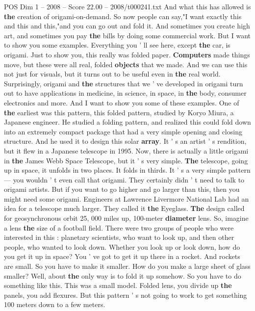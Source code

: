 \begin{textsample}{POS Dim 1 – 2008 – Score 22.00 – 2008/t000241.txt}
And what this has allowed is \textbf{the} creation of origami-on-demand.
So now people can say,"I want exactly this and this and this,"and you can go out and fold it.
And sometimes you create high art, and sometimes you pay \textbf{the} bills by doing some commercial work.
But I want to show you some examples.
Everything you ' ll see here, except \textbf{the} car, is origami.
Just to show you, this really was folded paper. \textbf{Computers} made things move, but these were all real, folded \textbf{objects} that we made.
And we can use this not just for visuals, but it turns out to be useful even in \textbf{the} real world.
Surprisingly, origami and \textbf{the} structures that we ' ve developed in origami turn out to have applications in medicine, in science, in space, in \textbf{the} body, consumer electronics and more.
And I want to show you some of these examples.
One of \textbf{the} earliest was this pattern, this folded pattern, studied by Koryo Miura, a Japanese engineer.
He studied a folding pattern, and realized this could fold down into an extremely compact package that had a very simple opening and closing structure.
And he used it to design this solar \textbf{array}.
It ' s an artist ' s rendition, but it flew in a Japanese telescope in 1995.
Now, there is actually a little origami in \textbf{the} James Webb Space Telescope, but it ' s very simple. \textbf{The} telescope, going up in space, it unfolds in two places.
It folds in thirds.
It ' s a very simple pattern — you wouldn ' t even call that origami.
They certainly didn ' t need to talk to origami artists.
But if you want to go higher and go larger than this, then you might need some origami.
Engineers at Lawrence Livermore National Lab had an idea for a telescope much larger.
They called it \textbf{the} Eyeglass. \textbf{The} design called for geosynchronous orbit 25, 000 miles up, 100-meter \textbf{diameter} lens.
So, imagine a lens \textbf{the} size of a football field.
There were two groups of people who were interested in this : planetary scientists, who want to look up, and then other people, who wanted to look down.
Whether you look up or look down, how do you get it up in space?
You ' ve got to get it up there in a rocket.
And rockets are small.
So you have to make it smaller.
How do you make a large sheet of glass smaller?
Well, about \textbf{the} only way is to fold it up somehow.
So you have to do something like this.
This was a small model.
Folded lens, you divide up \textbf{the} panels, you add flexures.
But this pattern ' s not going to work to get something 100 meters down to a few meters.

\end{textsample}

